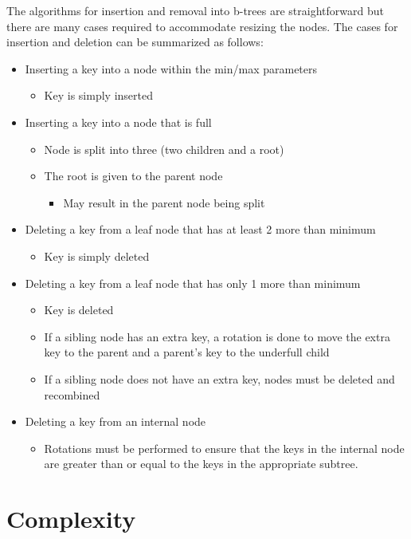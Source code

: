 The algorithms for insertion and removal into b-trees are straightforward but there are many cases required to accommodate resizing the nodes. The cases for insertion and deletion can be summarized as follows:
\begin{itemize}
	\item Inserting a key into a node within the min/max parameters
\begin{itemize}
	\item Key is simply inserted
\end{itemize}
	\item Inserting a key into a node that is full
\begin{itemize}
	\item Node is split into three (two children and a root)
	\item The root is given to the parent node
\begin{itemize}
	\item May result in the parent node being split
\end{itemize}
\end{itemize}
	\item Deleting a key from a leaf node that has at least 2 more than minimum
\begin{itemize}
	\item Key is simply deleted
\end{itemize}
	\item Deleting a key from a leaf node that has only 1 more than minimum
\begin{itemize}
	\item Key is deleted
	\item If a sibling node has an extra key, a rotation is done to move the extra key to the parent and a parent’s key to the underfull child
	\item If a sibling node does not have an extra key, nodes must be deleted and recombined
\end{itemize}
	\item Deleting a key from an internal node
\begin{itemize}
	\item Rotations must be performed to ensure that the keys in the internal node are greater than or equal to the keys in the appropriate subtree.
\end{itemize}
\end{itemize}

\section{Complexity}

